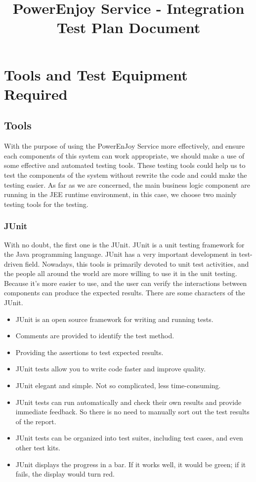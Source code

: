 \documentclass{article}
\title{PowerEnjoy Service - Integration Test Plan Document}
\begin{document}
	\section{Tools and Test Equipment Required}
	
	\subsection{Tools}
	
	With the purpose of using the PowerEnJoy Service more effectively, and ensure each components of this system can work appropriate, we should make a use of some effective and automated testing tools. These testing tools could help us to test the components of the system without rewrite the code and could make the testing easier.
	\newline
	As far as we are concerned, the main business logic component are running in the JEE runtime environment, in this case, we choose two mainly testing tools for the testing.
	
	\subsubsection{JUnit}
	With no doubt, the first one is the JUnit. JUnit is a unit testing framework for the Java programming language. JUnit has a very important development in test-driven field. Nowadays, this tools is primarily devoted to unit test activities, and the people all around the world are more willing to use it in the unit testing. Because it's more easier to use, and the user can verify the interactions between components can produce the expected results. There are some characters of the JUnit.
		\begin{itemize}
		\item JUnit is an open source framework for writing and running tests.
		\item Comments are provided to identify the test method.
		\item Providing the assertions to test expected results.
		\item JUnit tests allow you to write code faster and improve quality.
		\item JUnit elegant and simple. Not so complicated, less time-consuming.
		\item JUnit tests can run automatically and check their own results and provide immediate feedback. So there is no need to manually sort out the test results of the report.
		\item JUnit tests can be organized into test suites, including test cases, and even other test kits.
		\item JUnit displays the progress in a bar. If it works well, it would be green; if it fails, the display would turn red.
		\end{itemize}
	
\end{document}
